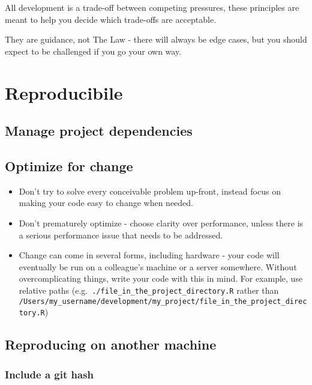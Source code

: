 \documentclass[]{book}
\providecommand{\tightlist}{%
  \setlength{\itemsep}{0pt}\setlength{\parskip}{0pt}}
\begin{document}
All development is a trade-off between competing pressures, these principles are meant to help you decide which trade-offs are acceptable.

They are guidance, not The Law - there will always be edge cases, but you should expect to be challenged if you go your own way.

\hypertarget{reproduce}{%
\section{Reproducibile}\label{reproduce}}

\hypertarget{projdep}{%
\subsection{Manage project dependencies}\label{projdep}}

\hypertarget{change}{%
\subsection{Optimize for change}\label{change}}

\begin{itemize}
\tightlist
\item
  Don't try to solve every conceivable problem up-front, instead focus on making your code easy to change when needed.
\item
  Don't prematurely optimize - choose clarity over performance, unless there is a serious performance issue that needs to be addressed.
\item
  Change can come in several forms, including hardware - your code will eventually be run on a colleague's machine or a server somewhere. Without overcomplicating things, write your code with this in mind. For example, use relative paths (e.g.~\texttt{./file\_in\_the\_project\_directory.R} rather than \texttt{/Users/my\_username/development/my\_project/file\_in\_the\_project\_directory.R})
\end{itemize}

\hypertarget{githash}{%
\subsection{Reproducing on another machine}\label{githash}}

\hypertarget{include-a-git-hash}{%
\subsubsection*{Include a git hash}\label{include-a-git-hash}}
\end{document}
